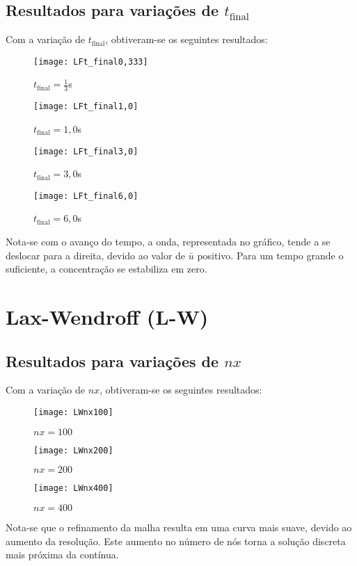\subsection{Resultados para variações de $t_{\text{final}}$}
Com a variação de $t_{\text{final}}$, obtiveram-se os seguintes resultados:
\begin{figure}[H]
    \centering
    \texttt{[image: LFt\_final0,333]}
    \caption{$t_{\text{final}} = \frac{1}{3}$s}
\end{figure}
\begin{figure}[H]
    \centering
    \texttt{[image: LFt\_final1,0]}
    \caption{$t_{\text{final}} = 1,0$s}
\end{figure}
\begin{figure}[H]
    \centering
    \texttt{[image: LFt\_final3,0]}
    \caption{$t_{\text{final}} = 3,0$s}
\end{figure}
\begin{figure}[H]
    \centering
    \texttt{[image: LFt\_final6,0]}
    \caption{$t_{\text{final}} = 6,0$s}
\end{figure}
Nota-se com o avanço do tempo, a onda, representada no gráfico, tende a se
deslocar para a direita, devido ao valor de $\bar{u}$ positivo. Para um tempo
grande o suficiente, a concentração se estabiliza em zero.

\section{Lax-Wendroff (L-W)}

\subsection{Resultados para variações de $nx$}
Com a variação de $nx$, obtiveram-se os seguintes resultados:
\begin{figure}[H]
    \centering
    \texttt{[image: LWnx100]}
    \caption{$nx = 100$}
\end{figure}
\begin{figure}[H]
    \centering
    \texttt{[image: LWnx200]}
    \caption{$nx = 200$}
\end{figure}
\begin{figure}[H]
    \centering
    \texttt{[image: LWnx400]}
    \caption{$nx = 400$}
\end{figure}
Nota-se que o refinamento da malha resulta em uma curva mais suave, devido ao
aumento da resolução. Este aumento no número de nós torna a solução discreta
mais próxima da contínua.

